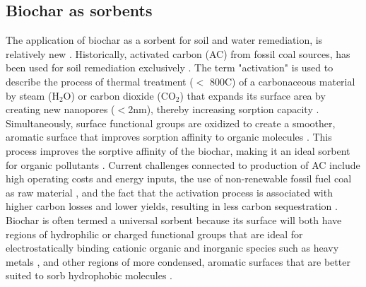 \subsection{Biochar as sorbents}
The application of biochar as a sorbent for soil and water remediation, is relatively new \citep{beesley2011review}. Historically, activated carbon (AC) from fossil coal sources, has been used for soil remediation exclusively \citep{hagemann2018activated}. The term "activation" is used to describe the process of thermal treatment ($<$ 800\textdegree C) of a carbonaceous material by steam ($\mathrm{H_2O}$) or carbon dioxide ($\mathrm{CO_2}$) that expands its surface area by creating new nanopores ($<$2nm), thereby increasing sorption capacity \citep{LehmannAndJoseph2015}. Simultaneously, surface functional groups are oxidized to create a smoother, aromatic surface that improves sorption affinity to organic molecules \citep{sajjadi2019comprehensive}. This process improves the sorptive affinity of the biochar, making it an ideal sorbent for organic pollutants \citep{Ahmad2014}. Current challenges connected to production of AC include high operating costs and energy inputs, the use of non-renewable fossil fuel coal as raw material \citep{Li2019}, and the fact that the activation process is associated with higher carbon losses and lower yields, resulting in less carbon sequestration \citep{Sormo2021}. Biochar is often termed a universal sorbent because its surface will both have regions of hydrophilic or charged functional groups that are ideal for electrostatically binding cationic organic and inorganic species such as heavy metals \citep{silvani2019can,zhang2013sorption}, and other regions of more condensed, aromatic surfaces that are better suited to sorb hydrophobic molecules \citep{Cornelissen2005}.

